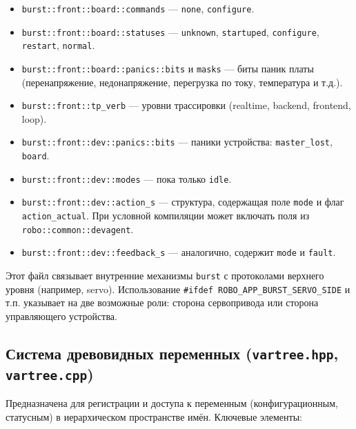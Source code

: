 \documentclass[a4paper,12pt]{article}
\begin{document}
\begin{itemize}
    \item \texttt{burst::front::board::commands} — \texttt{none}, \texttt{configure}.
    \item \texttt{burst::front::board::statuses} — \texttt{unknown}, \texttt{startuped}, \texttt{configure}, \texttt{restart}, \texttt{normal}.
    \item \texttt{burst::front::board::panics::bits} и \texttt{masks} — биты паник платы (перенапряжение, недонапряжение, перегрузка по току, температура и т.д.).
    \item \texttt{burst::front::tp\_verb} — уровни трассировки (realtime, backend, frontend, loop).
    \item \texttt{burst::front::dev::panics::bits} — паники устройства: \texttt{master\_lost}, \texttt{board}.
    \item \texttt{burst::front::dev::modes} — пока только \texttt{idle}.
    \item \texttt{burst::front::dev::action\_s} — структура, содержащая поле \texttt{mode} и флаг \texttt{action\_actual}. При условной компиляции может включать поля из \texttt{robo::common::devagent}.
    \item \texttt{burst::front::dev::feedback\_s} — аналогично, содержит \texttt{mode} и \texttt{fault}.
\end{itemize}

Этот файл связывает внутренние механизмы \texttt{burst} с протоколами верхнего уровня (например, servo). Использование \texttt{\#ifdef ROBO\_APP\_BURST\_SERVO\_SIDE} и т.п. указывает на две возможные роли: сторона сервопривода или сторона управляющего устройства.

\subsection{Система древовидных переменных (\texttt{vartree.hpp}, \texttt{vartree.cpp})}

Предназначена для регистрации и доступа к переменным (конфигурационным, статусным) в иерархическом пространстве имён. Ключевые элементы:
\end{document}
